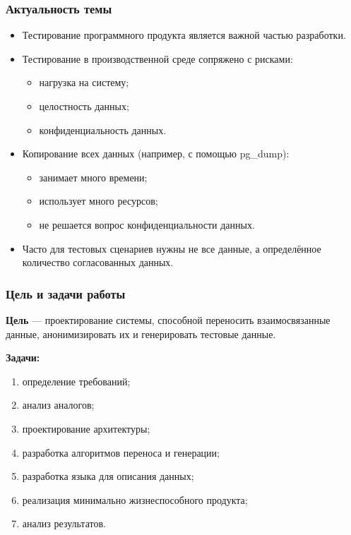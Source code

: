 \documentclass[pdf, hyperref={unicode}, aspectratio=169]{beamer}
\begin{document}

{
	\frame{\titlepage}
}

\begin{frame}
	\frametitle{Актуальность темы}
	\begin{itemize}
		\item Тестирование программного продукта является важной частью разработки.

		\item Тестирование в производственной среде сопряжено с рисками:
		\begin{itemize}
			\item нагрузка на систему;
			\item целостность данных;
			\item конфиденциальность данных.
		\end{itemize}

		\item Копирование всех данных (например, с помощью pg\_dump):
		\begin{itemize}
			\item занимает много времени;
			\item использует много ресурсов;
			\item не решается вопрос конфиденциальности данных.
		\end{itemize}

		\item Часто для тестовых сценариев нужны не все данные, а определённое количество согласованных данных.
	\end{itemize}
\end{frame}


\begin{frame}
	\frametitle{Цель и задачи работы}
	
	\textbf{Цель} --- проектирование системы, способной переносить взаимосвязанные данные, анонимизировать их и генерировать тестовые данные.

	\textbf{Задачи:}
	\begin{enumerate}
		\item определение требований;
		\item анализ аналогов;
		\item проектирование архитектуры;
		\item разработка алгоритмов переноса и генерации;
		\item разработка языка для описания данных;
		\item реализация минимально жизнеспособного продукта;
		\item анализ результатов.
	\end{enumerate}
\end{frame}
\end{document}
